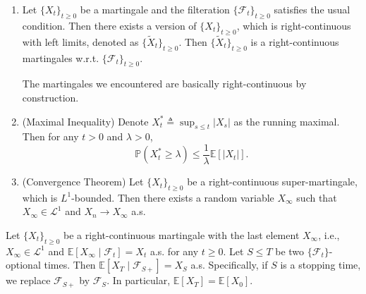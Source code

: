\begin{theorem}\label{The:con:mart}
\begin{enumerate}
\item
Let $\{X_t\}_{t\ge0}$ be a martingale and the filteration $\{\mathcal{F}_t\}_{t\ge0}$ satisfies the usual condition.
Then there exists a version of $\{X_t\}_{t\ge0}$, which is right-continuous with left limits, denoted as $\{\tilde{X}_t\}_{t\ge0}$.
Then $\{\tilde{X}_t\}_{t\ge0}$ is a right-continuous martingales w.r.t. $\{\mathcal{F}_t\}_{t\ge0}$.
\begin{remark}
The martingales we encountered are basically right-continuous by construction.
\end{remark}
\item
(Maximal Inequality) %
Denote $X_t^* \triangleq \sup_{s\le t}|X_s|$ as the running maximal. Then for any $t>0$ and $\lambda>0$,
\[
\mathbb{P}(X_t^*\ge\lambda)\le\frac{1}{\lambda}\mathbb{E}[|X_t|].
\]
\item
(Convergence Theorem)
Let $\{X_t\}_{t\ge0}$ be a right-continuous super-martingale, which is ${L}^1$-bounded.
Then there exists a random variable $X_\infty$ such that $X_\infty\in\mathcal{L}^1$ and $X_n\to X_\infty$ a.s.
\end{enumerate}
\end{theorem}

\begin{theorem}\label{The:5:4}
Let $\{X_t\}_{t\ge0}$ be a right-continuous martingale with the last element $X_\infty$, i.e.,
$X_\infty\in\mathcal{L}^1$ and $\mathbb{E}[X_\infty\mid\mathcal{F}_t]=X_t$ a.s. for any $t\ge0$.
Let $S\le T$ be two $\{\mathcal{F}_t\}$-optional times. 
Then $\mathbb{E}[X_T\mid\mathcal{F}_{S+}] = X_S$ a.s. 
Specifically, if $S$ is a stopping time, we replace $\mathcal{F}_{S+}$ by $\mathcal{F}_S$.
In particular, $\mathbb{E}[X_T] = \mathbb{E}[X_0]$.
\end{theorem}



